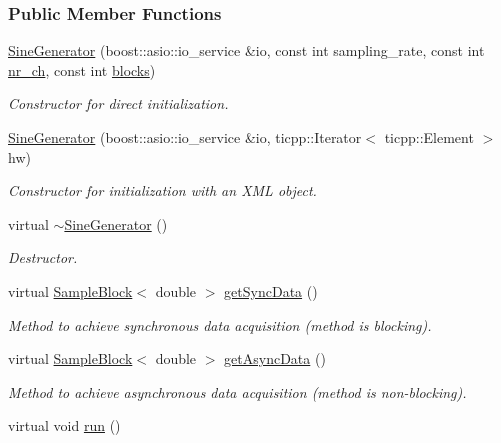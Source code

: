 \subsubsection*{Public Member Functions}
\begin{DoxyCompactItemize}
\item 
\hyperlink{class_sine_generator_aab92800ac3de55e4b9235c47a769650a}{SineGenerator} (boost::asio::io\_\-service \&io, const int sampling\_\-rate, const int \hyperlink{class_h_w_thread_a316d76b7b23a93f25832b7a575cfb8db}{nr\_\-ch}, const int \hyperlink{class_h_w_thread_abef19c1294d62c789a37e8f1e1af0c97}{blocks})
\begin{DoxyCompactList}\small\item\em Constructor for direct initialization. \item\end{DoxyCompactList}\item 
\hyperlink{class_sine_generator_a42bff2f5cd6f4e08d94e9b9191cb9a3d}{SineGenerator} (boost::asio::io\_\-service \&io, ticpp::Iterator$<$ ticpp::Element $>$ hw)
\begin{DoxyCompactList}\small\item\em Constructor for initialization with an XML object. \item\end{DoxyCompactList}\item 
\hypertarget{class_sine_generator_a624cef7895424d21f68b9103ffc6c0a6}{
virtual \hyperlink{class_sine_generator_a624cef7895424d21f68b9103ffc6c0a6}{$\sim$SineGenerator} ()}
\label{class_sine_generator_a624cef7895424d21f68b9103ffc6c0a6}

\begin{DoxyCompactList}\small\item\em Destructor. \item\end{DoxyCompactList}\item 
virtual \hyperlink{class_sample_block}{SampleBlock}$<$ double $>$ \hyperlink{class_sine_generator_a7c239c664d3559988889cd5d9f90d854}{getSyncData} ()
\begin{DoxyCompactList}\small\item\em Method to achieve synchronous data acquisition (method is blocking). \item\end{DoxyCompactList}\item 
virtual \hyperlink{class_sample_block}{SampleBlock}$<$ double $>$ \hyperlink{class_sine_generator_ad609b16d89e1d1c762cd94023ea41439}{getAsyncData} ()
\begin{DoxyCompactList}\small\item\em Method to achieve asynchronous data acquisition (method is non-\/blocking). \item\end{DoxyCompactList}\item 
\hypertarget{class_sine_generator_a5c517b72ca7c32ec222c4cbeab8ed053}{
virtual void \hyperlink{class_sine_generator_a5c517b72ca7c32ec222c4cbeab8ed053}{run} ()}
\label{class_sine_generator_a5c517b72ca7c32ec222c4cbeab8ed053}


\end{DoxyCompactItemize}
